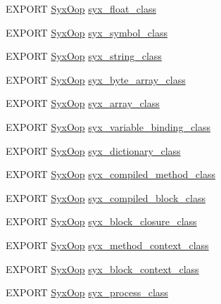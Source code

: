 \begin{CompactItemize}
\item 
EXPORT \hyperlink{syx-types_8h_1121caba2d40b2ce090b640762744ccd}{SyxOop} \hyperlink{syx-object_8h_a99406e5776ba4d5b8584c9dba551379}{syx\_\-float\_\-class}
\item 
EXPORT \hyperlink{syx-types_8h_1121caba2d40b2ce090b640762744ccd}{SyxOop} \hyperlink{syx-object_8h_e10f18ec5e45484612b5a7fe6b96518d}{syx\_\-symbol\_\-class}
\item 
EXPORT \hyperlink{syx-types_8h_1121caba2d40b2ce090b640762744ccd}{SyxOop} \hyperlink{syx-object_8h_e1c7125650c6406bf4809ce106de8b36}{syx\_\-string\_\-class}
\item 
EXPORT \hyperlink{syx-types_8h_1121caba2d40b2ce090b640762744ccd}{SyxOop} \hyperlink{syx-object_8h_ee7c988bfeb850b7107cb7a3cc568cb7}{syx\_\-byte\_\-array\_\-class}
\item 
EXPORT \hyperlink{syx-types_8h_1121caba2d40b2ce090b640762744ccd}{SyxOop} \hyperlink{syx-object_8h_93a0ea8cd9172fdef4a6b60b40fd0e4e}{syx\_\-array\_\-class}
\item 
EXPORT \hyperlink{syx-types_8h_1121caba2d40b2ce090b640762744ccd}{SyxOop} \hyperlink{syx-object_8h_4fb5b24130577a369d026a1849447dd1}{syx\_\-variable\_\-binding\_\-class}
\item 
EXPORT \hyperlink{syx-types_8h_1121caba2d40b2ce090b640762744ccd}{SyxOop} \hyperlink{syx-object_8h_fe9b69c223c0ab9ddb51d1f49b58dd96}{syx\_\-dictionary\_\-class}
\item 
EXPORT \hyperlink{syx-types_8h_1121caba2d40b2ce090b640762744ccd}{SyxOop} \hyperlink{syx-object_8h_e73b435f28f6326845c790d616f0763f}{syx\_\-compiled\_\-method\_\-class}
\item 
EXPORT \hyperlink{syx-types_8h_1121caba2d40b2ce090b640762744ccd}{SyxOop} \hyperlink{syx-object_8h_6b5b733fa1150efc8b27835298b58087}{syx\_\-compiled\_\-block\_\-class}
\item 
EXPORT \hyperlink{syx-types_8h_1121caba2d40b2ce090b640762744ccd}{SyxOop} \hyperlink{syx-object_8h_80d6a707deae30357e97c83c75473f14}{syx\_\-block\_\-closure\_\-class}
\item 
EXPORT \hyperlink{syx-types_8h_1121caba2d40b2ce090b640762744ccd}{SyxOop} \hyperlink{syx-object_8h_4273e7a4f4fe7836b8eba627661e2d06}{syx\_\-method\_\-context\_\-class}
\item 
EXPORT \hyperlink{syx-types_8h_1121caba2d40b2ce090b640762744ccd}{SyxOop} \hyperlink{syx-object_8h_df59508211830ba19845fcf2e48dedad}{syx\_\-block\_\-context\_\-class}
\item 
EXPORT \hyperlink{syx-types_8h_1121caba2d40b2ce090b640762744ccd}{SyxOop} \hyperlink{syx-object_8h_e3520eeaffb29e4a9780c6e257a022ce}{syx\_\-process\_\-class}

\end{CompactItemize}
